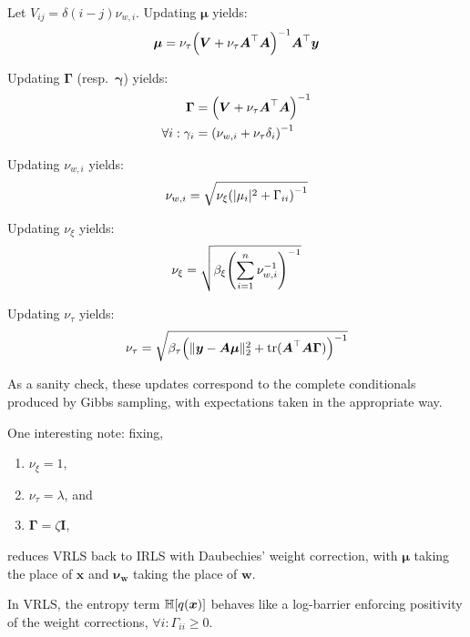 \documentclass{article}
\numberwithin{equation}{section}
\newcommand{\lh}{\mathopen{}\mathclose\bgroup\left}
\newcommand{\rh}{\aftergroup\egroup\right}
\newcommand{\entropy}[1]{\mathbb{H}\lh[ #1 \rh]}
\newcommand{\m}[1]{\boldsymbol{#1}}
\DeclareMathOperator{\trace}{tr}
\begin{document}
Let $V_{ij} = \delta(i-j) \nu_{w,i}$.
Updating $\m{\mu}$ yields:
\begin{equation}
\m{\mu} =
 \nu_\tau \lh( \m{V} + \nu_\tau \m{A}^\top \m{A} \rh)^{-1} \m{A}^\top \m{y}
\end{equation}

Updating $\m{\Gamma}$ (resp.~$\m{\gamma}$) yields:
\begin{equation}
\begin{aligned}
\m{\Gamma} &= \lh( \m{V} + \nu_\tau \m{A}^\top \m{A} \rh)^{-1}
\\
\forall i: \gamma_i &= \lh( \nu_{w,i} + \nu_\tau \delta_i \rh)^{-1}
\end{aligned}
\end{equation}

Updating $\nu_{w,i}$ yields:
\begin{equation}
\nu_{w,i} = \sqrt{\nu_\xi \lh( |\mu_i|^2 + \Gamma_{ii} \rh)^{-1}}
\end{equation}

Updating $\nu_\xi$ yields:
\begin{equation}
\nu_\xi = \sqrt{\beta_\xi \lh( \sum_{i=1}^n \nu_{w,i}^{-1} \rh)^{-1}}
\end{equation}

Updating $\nu_\tau$ yields:
\begin{equation}
\nu_\tau =
 \sqrt{\beta_\tau \lh(
  \| \m{y} - \m{A} \m{\mu} \|_2^2 + \trace(\m{A}^\top \m{A} \m{\Gamma})
 \rh)^{-1}}
\end{equation}

As a sanity check, these updates correspond to the complete conditionals
produced by Gibbs sampling, with expectations taken in the appropriate
way.

One interesting note: fixing,
\begin{enumerate}
 \item $\nu_\xi = 1$,
 \item $\nu_\tau = \lambda$, and
 \item $\m{\Gamma} = \zeta \m{I}$,
\end{enumerate}
reduces VRLS back to IRLS with Daubechies' weight correction,
with $\m{\mu}$ taking the place of $\m{x}$ and $\m{\nu_w}$ taking
the place of $\m{w}$.

In VRLS, the entropy term $\entropy{q(\m{x})}$ behaves like a log-barrier
enforcing positivity of the weight corrections,
$\forall i: \Gamma_{ii} \ge 0$.

\end{document}
